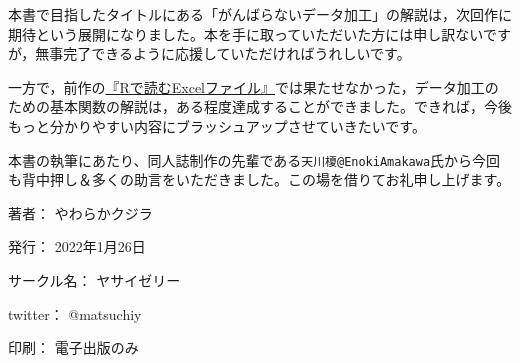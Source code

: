 \documentclass[
  xelatex,ja=standard, b5paper]{bxjsbook}
\begin{document}
本書で目指したタイトルにある「がんばらないデータ加工」の解説は，次回作に期待という展開になりました。本を手に取っていただいた方には申し訳ないですが，無事完了できるように応援していただければうれしいです。

一方で，前作の\href{https://techbookfest.org/product/4794168259903488?productVariantID=5913872206659584}{『Rで読むExcelファイル』}では果たせなかった，データ加工のための基本関数の解説は，ある程度達成することができました。できれば，今後もっと分かりやすい内容にブラッシュアップさせていきたいです。

本書の執筆にあたり、同人誌制作の先輩である\texttt{天川榎@EnokiAmakawa}氏から今回も背中押し＆多くの助言をいただきました。この場を借りてお礼申し上げます。

\clearpage
{}
\begin{flushright}
\begin{minipage}{0.5\hsize}
\begin{description}
  \item{著者：} やわらかクジラ
  \item{発行：} 2022年1月26日
  \item{サークル名：} ヤサイゼリー
  \item{twitter：} @matsuchiy
  \item{印刷：} 電子出版のみ
\end{description}
\end{minipage}
\end{flushright}
\clearpage
\end{document}
